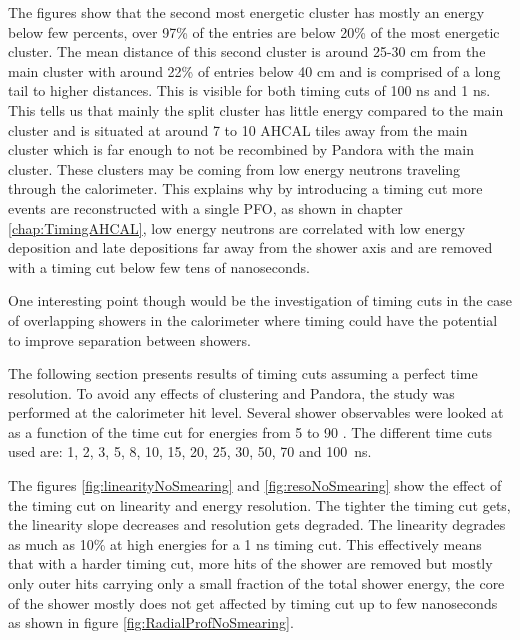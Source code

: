 The figures show that the second most energetic cluster has mostly an energy below few percents, over 97\% of the entries are below 20\% of the most energetic cluster. The mean distance of this second cluster is around 25-30 cm from the main cluster with around 22\% of entries below 40 cm and is comprised of a long tail to higher distances. This is visible for both timing cuts of 100 ns and 1 ns. This tells us that mainly the split cluster has little energy compared to the main cluster and is situated at around 7 to 10 AHCAL tiles away from the main cluster which is far enough to not be recombined by Pandora with the main cluster. These clusters may be coming from low energy neutrons traveling through the calorimeter. This explains why by introducing a timing cut more events are reconstructed with a single PFO, as shown in chapter \ref{chap:TimingAHCAL}, low energy neutrons are correlated with low energy deposition and late depositions far away from the shower axis and are removed with a timing cut below few tens of nanoseconds.

One interesting point though would be the investigation of timing cuts in the case of overlapping showers in the calorimeter where timing could have the potential to improve separation between showers.

The following section presents results of timing cuts assuming a perfect time resolution. To avoid any effects of clustering and Pandora, the study was performed at the calorimeter hit level. Several shower observables were looked at as a function of the time cut for energies from 5 \GeV to 90 \GeV \kzeroL. The different time cuts used are: 1, 2, 3, 5, 8, 10, 15, 20, 25, 30, 50, 70 and \SI{100}{\nano\second}.

The figures \ref{fig:linearityNoSmearing} and \ref{fig:resoNoSmearing} show the effect of the timing cut on linearity and energy resolution. The tighter the timing cut gets, the linearity slope decreases and resolution gets degraded. The linearity degrades as much as 10\% at high energies for a 1 ns timing cut. This effectively means that with a harder timing cut, more hits of the shower are removed but mostly only outer hits carrying only a small fraction of the total shower energy, the core of the shower mostly does not get affected by timing cut up to few nanoseconds as shown in figure \ref{fig:RadialProfNoSmearing}.

